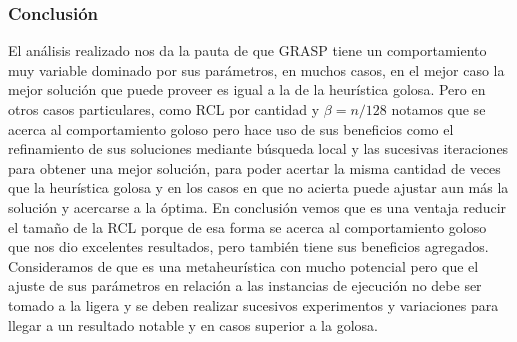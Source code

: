 \subsubsection{Conclusi\'on}

El an\'alisis realizado nos da la pauta de que GRASP tiene un comportamiento muy variable dominado por sus par\'ametros, en muchos casos, en el mejor caso la mejor soluci\'on que puede proveer es igual a la de la heur\'istica golosa. Pero en otros casos particulares, como RCL por cantidad y $\beta = n/128$ notamos que se acerca al comportamiento goloso pero hace uso de sus beneficios como el refinamiento de sus soluciones mediante b\'usqueda local y las sucesivas iteraciones para obtener una mejor soluci\'on, para poder acertar la misma cantidad de veces que la heur\'istica golosa y en los casos en que no acierta puede ajustar aun m\'as la soluci\'on y acercarse a la \'optima. En conclusi\'on vemos que es una ventaja reducir el tamaño de la RCL porque de esa forma se acerca al comportamiento goloso que nos dio excelentes resultados, pero tambi\'en tiene sus beneficios agregados. Consideramos de que es una metaheur\'istica con mucho potencial pero que el ajuste de sus par\'ametros en relaci\'on a las instancias de ejecuci\'on no debe ser tomado a la ligera y se deben realizar sucesivos experimentos y variaciones para llegar a un resultado notable y en casos superior a la golosa.


